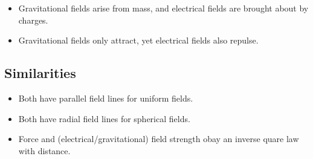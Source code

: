 \documentclass{article}
\begin{document}
\begin{itemize}

	\item Gravitational fields arise from mass, and electrical fields are
	brought about by charges.

	\item Gravitational fields only attract, yet electrical fields also repulse.

\end{itemize}

\subsection*{Similarities}

\begin{itemize}

	\item Both have parallel field lines for uniform fields.

	\item Both have radial field lines for spherical fields.

	\item Force and (electrical/gravitational) field strength obay an inverse
	quare law with distance.

\end{itemize}
\end{document}

